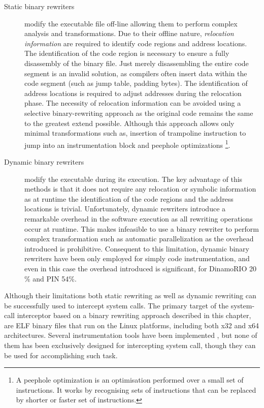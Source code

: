 \begin{description}

\item[Static binary rewriters] modify the executable file off-line allowing them to perform complex analysis and transformations. Due to their offline nature, \emph{relocation information} are required to identify code regions and address locations. The identification of the code region is necessary to ensure a fully disassembly of the binary file. Just merely disassembling  the entire code segment is an invalid solution, as  compilers often insert data within the code segment (such as jump table, padding bytes). The identification of address locations is required to adjust addresses during the relocation phase. The necessity of relocation information can be avoided using a selective binary-rewriting approach \cite{BIRD, seccompsandbox} as the original code remains the same to the greatest extend possible. Although this approach allows only minimal transformations such as, insertion of trampoline instruction to jump into an instrumentation block and peephole optimizations \footnote{A peephole optimization is an optimisation performed over a small set of instructions. It works by recognising sets of instructions that can be replaced by shorter or faster set of instructions.}.

\item[Dynamic binary rewriters] modify the executable during its execution. The key advantage of this methods is that it does not require any relocation or symbolic information as at runtime the identification of the code regions and the address locations is trivial. Unfortunately, dynamic rewriters introduce a remarkable overhead in the software execution as all rewriting operations occur at runtime. This makes infeasible to use a binary rewriter to perform complex transformation such as automatic parallelization as the overhead introduced is prohibitive. Consequent to this limitation, dynamic binary rewriters have been only employed for simply code instrumentation, and even in this case the overhead introduced is significant, for DinamoRIO 20 \% and PIN 54\%.
\end{description}

Although their limitations both static rewriting as well as dynamic rewriting can be successfully used to intercept system calls. The primary target of the system-call interceptor based on a binary rewriting approach described in this chapter, are ELF binary files that run on the Linux platforms, including both x32 and x64 architectures. Several instrumentation tools have been implemented \cite{PEBIL, BIRD, REINS}, but none of them has been exclusively designed for intercepting system call, though they can be used for accomplishing such task. 

